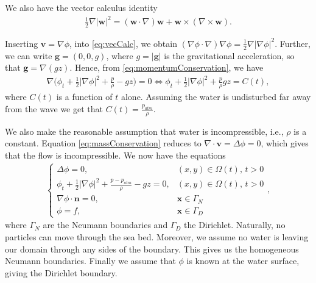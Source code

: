 \documentclass[11pt]{article}
\begin{document}
We also have the vector calculus identity
\begin{align}
    \label{eq:vecCalc}
    \frac{1}{2}\nabla |\bm{w}|^2 = (\bm{w}\cdot \nabla) \bm{w} + \bm{w} \times (\nabla \times \bm{w}).
\end{align}

Inserting $\bm{v} = \nabla \phi$, into \eqref{eq:vecCalc}, we obtain $(\nabla \phi \cdot \nabla) \nabla \phi = \frac{1}{2}\nabla |\nabla \phi|^2.$ Further, we can write $\bm{g} = (0,0,g)$, where $g = |\bm{g}|$ is the gravitational acceleration, so that
$\bm{g} = \nabla (gz)$. Hence, from \eqref{eq:momentumConservation}, we have
\begin{align*}
    \nabla\bigg(\phi_t + \frac{1}{2}|\nabla \phi|^2 + \frac{p}{\rho} - g z \bigg) = 0
    \iff \phi_t + \frac{1}{2}|\nabla \phi|^2 + \frac{p}{\rho}  g z = C(t),
\end{align*}
where $C(t)$ is a function of $t$ alone. Assuming the water is undisturbed far away from the wave
we get that $C(t) = \frac{p_{atm}}{\rho}$.

We also make the reasonable assumption that water is incompressible, i.e., $\rho$ is a constant. Equation \eqref{eq:massConservation} reduces to
$\nabla \cdot \bm{v} = \Delta \phi = 0$, which gives that the flow is incompressible. We now have
the equations
\begin{align}
    \label{eq:IncompNavierStokes}
    \begin{cases}
        \Delta \phi = 0,                                                 &    (x,y) \in \Omega(t), \, t > 0 \\
        \phi_t + \frac{1}{2}|\nabla \phi|^2 + \frac{p-p_{atm}}{\rho} - g z = 0,
                                                                         &    (x,y) \in \Omega(t), \, t > 0 \\
        \nabla \phi \cdot \bm{n} = 0,                                    &    \bm{x} \in \Gamma_N \\
        \phi = f,                                                        &    \bm{x} \in \Gamma_D
    \end{cases},
\end{align}
where $\Gamma_N$ are the Neumann boundaries and $\Gamma_D$ the Dirichlet. Naturally, no particles can move through the sea bed. Moreover, we assume no water is leaving our domain through any sides of the boundary.  This gives us the homogeneous Neumann boundaries. Finally we assume that $\phi$ is known at the water surface, giving the Dirichlet boundary. 
\end{document}
